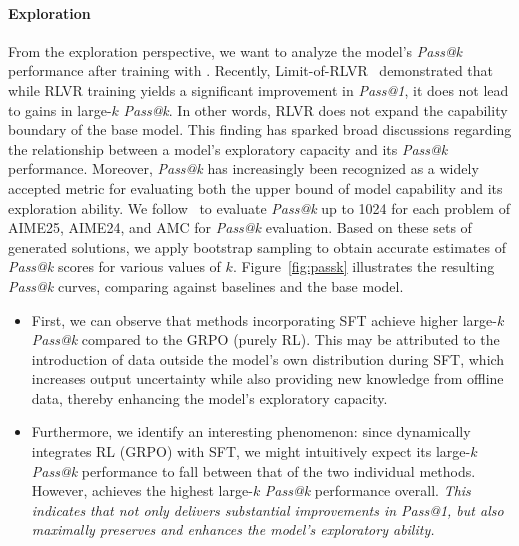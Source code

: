 \paragraph{\textcolor{cyan!40!black}{Exploration}}
From the exploration perspective, we want to analyze the model’s \emph{Pass@k} performance after training with \mot.
Recently, Limit-of-RLVR~\citep{yue2025does} demonstrated that while RLVR training yields a significant improvement in \emph{Pass@1}, it does not lead to gains in large-$k$ \emph{Pass@k}.
In other words, RLVR does not expand the capability boundary of the base model.
This finding has sparked broad discussions regarding the relationship between a model’s exploratory capacity and its \emph{Pass@k} performance. Moreover, \emph{Pass@k} has increasingly been recognized as a widely accepted metric for evaluating both the upper bound of model capability and its exploration ability.
We follow~\citet{yue2025does} to evaluate \emph{Pass@k} up to 1024 for each problem of AIME25, AIME24, and AMC for \emph{Pass@k} evaluation.
Based on these sets of generated solutions, we apply bootstrap sampling to obtain accurate estimates of \emph{Pass@k} scores for various values of $k$.
Figure~\ref{fig:passk} illustrates the resulting \emph{Pass@k} curves, comparing \mot against baselines and the base model.

\begin{itemize}[leftmargin=2em]
    \item 
    First, we can observe that methods incorporating SFT achieve higher large-$k$ \emph{Pass@k} compared to the GRPO (purely RL).
    This may be attributed to the introduction of data outside the model’s own distribution during SFT, which increases output uncertainty while also providing new knowledge from offline data, thereby enhancing the model’s exploratory capacity.
    \item 
    Furthermore, we identify an interesting phenomenon: since \mot dynamically integrates RL (GRPO) with SFT, we might intuitively expect its large-$k$ \emph{Pass@k} performance to fall between that of the two individual methods.
    However, \mot achieves the highest large-$k$ \emph{Pass@k} performance overall.
    \emph{This indicates that \method not only delivers substantial improvements in Pass@1, but also maximally preserves and enhances the model’s exploratory ability.}
\end{itemize}


